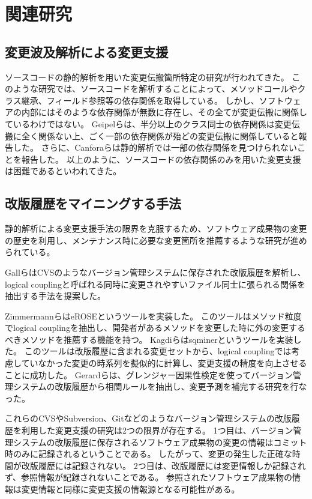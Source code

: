 \documentclass[a4paper]{jsbook}
\begin{document}
\chapter{関連研究}\label{related_chap}
\section{変更波及解析による変更支援}
ソースコードの静的解析を用いた変更伝搬箇所特定の研究が行われてきた\cite{792645}。
このような研究では、ソースコードを解析することによって、メソッドコールやクラス継承、フィールド参照等の依存関係を取得している。
しかし、ソフトウェアの内部にはそのような依存関係が無数に存在し、その全てが変更伝搬に関係しているわけではない。
Geipelら\cite{Geipel:2009}は、半分以上のクラス同士の依存関係は変更伝搬に全く関係ない上、ごく一部の依存関係が殆どの変更伝搬に関係していると報告した。
さらに、Canforaら\cite{5609732}は静的解析では一部の依存関係を見つけられないことを報告した。
以上のように、ソースコードの依存関係のみを用いた変更支援は困難であるといわれてきた。

\section{改版履歴をマイニングする手法}
静的解析による変更支援手法の限界を克服するため、ソフトウェア成果物の変更の歴史を利用し、メンテナンス時に必要な変更箇所を推薦するような研究が進められている。

Gallら\cite{738508}はCVSのようなバージョン管理システムに保存された改版履歴を解析し、logical couplingと呼ばれる同時に変更されやすいファイル同士に張られる関係を抽出する手法を提案した。

ZimmermannらはeROSEというツール\cite{Zimmermann:2005}を実装した。
このツールはメソッド粒度でlogical couplingを抽出し、開発者があるメソッドを変更した時に外の変更するべきメソッドを推薦する機能を持つ。
Kagdiらはsqminerというツール\cite{Kagdi:2006}を実装した。
このツールは改版履歴に含まれる変更セットから、logical couplingでは考慮していなかった変更の時系列を擬似的に計算し、変更支援の精度を向上させることに成功した。
Gerardら\cite{5609732}は、グレンジャー因果性検定を使ってバージョン管理システムの改版履歴から相関ルールを抽出し、変更予測を補完する研究を行なった。

これらのCVSやSubversion、Gitなどのようなバージョン管理システムの改版履歴を利用した変更支援の研究は2つの限界が存在する。
1つ目は、バージョン管理システムの改版履歴に保存されるソフトウェア成果物の変更の情報はコミット時のみに記録されるということである。
したがって、変更の発生した正確な時間が改版履歴には記録されない。
2つ目は、改版履歴には変更情報しか記録されず、参照情報が記録されないことである。
参照されたソフトウェア成果物の情報は変更情報と同様に変更支援の情報源となる可能性がある。
\end{document}
